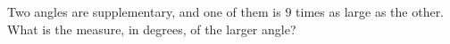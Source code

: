 Two angles are supplementary, and one of them is $9$ times as large as the other. What is the measure, in degrees, of the larger angle?
